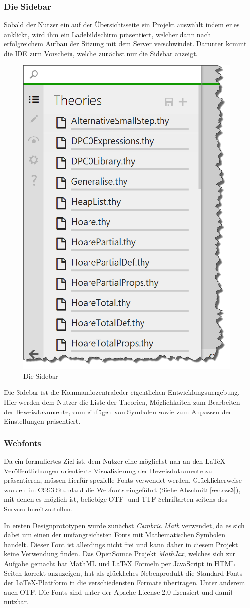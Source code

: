 \subsubsection{Die Sidebar}

Sobald der Nutzer ein auf der Übersichtsseite ein Projekt auswählt indem er es anklickt, wird ihm
ein Ladebildschirm präsentiert, welcher dann nach erfolgreichem Aufbau der Sitzung mit dem Server
verschwindet. Darunter kommt die IDE zum Vorschein, welche zunächst nur die Sidebar anzeigt.

\begin{figure}[!ht]
\centering
\includegraphics[width=0.4\linewidth]{images/screen-sidebar}
  \caption{Die Sidebar}
  \label{fig:screen-sidebar}
\end{figure}

Die Sidebar ist die \glqq Kommandozentrale\grqq der eigentlichen Entwicklungsumgebung. Hier werden
dem Nutzer die Liste der Theorien, Möglichkeiten zum Bearbeiten der Beweisdokumente, zum einfügen
von Symbolen sowie zum Anpassen der Einstellungen präsentiert.

\subsubsection{Webfonts}

Da ein formuliertes Ziel ist, dem Nutzer eine möglichst nah an den LaTeX Veröffentlichungen
orientierte Visualisierung der Beweisdukumente zu präsentieren, müssen hierfür spezielle Fonts
verwendet werden. Glücklicherweise wurden im CSS3 Standard die Webfonts eingeführt (Siehe
Abschnitt\,\ref{sec:css3}), mit denen es möglich ist, beliebige OTF- und TTF-Schriftarten seitens
des Servers bereitzustellen.

In ersten Designprototypen wurde zunächst \textit{Cambria Math} verwendet, da es sich dabei um einen
der umfangreichsten Fonts mit Mathematischen Symbolen handelt. Dieser Font ist allerdings nicht frei
und kann daher in diesem Projekt keine Verwendung finden. Das OpenSource Projekt \textit{MathJax},
welches sich zur Aufgabe gemacht hat MathML und LaTeX Formeln per JavaScript in HTML Seiten korrekt
anzuzeigen, hat als glückliches Nebenprodukt die Standard Fonts der LaTeX-Plattform in die
verschiedensten Formate übertragen. Unter anderem auch OTF. Die Fonts sind unter der Apache License
2.0 lizensiert und damit nutzbar.

